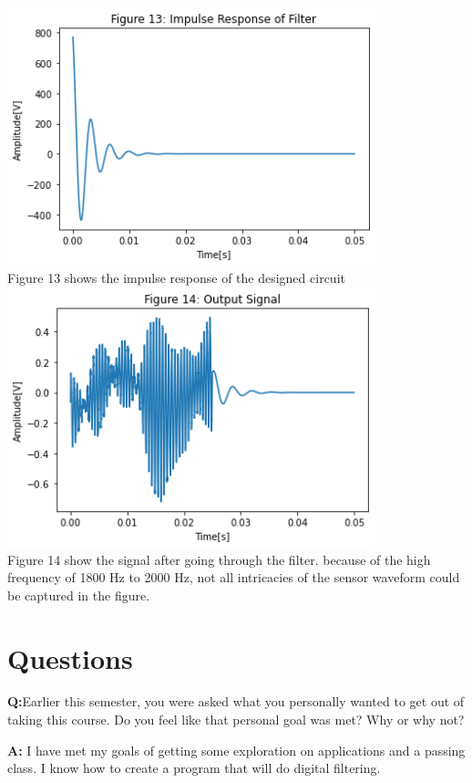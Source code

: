 \documentclass[12pt,a4paper]{article}
\newcommand{\Q}{\leavevmode\par\textbf {Q:}}
\newcommand{\A}{\par\textbf{A:} \normalfont}
\begin{document}
\includegraphics[width=0.8\textwidth]{Figure 13.png}\\
Figure 13 shows the impulse response of the designed circuit\\

\includegraphics[width=0.8\textwidth]{Figure 14.png}\\
Figure 14 show the signal after going through the filter. because of the high frequency of 1800 Hz to 2000 Hz, not all intricacies of the sensor waveform could be captured in the figure.\\



\section{Questions}\label{sec:res}

\Q Earlier this semester, you were asked what you personally wanted to get out of taking this course. Do you feel like that personal goal was met? Why or why not?
\A I have met my goals of getting some exploration on applications and a passing class.  I know how to create a program that will do digital filtering.
\end{document}
